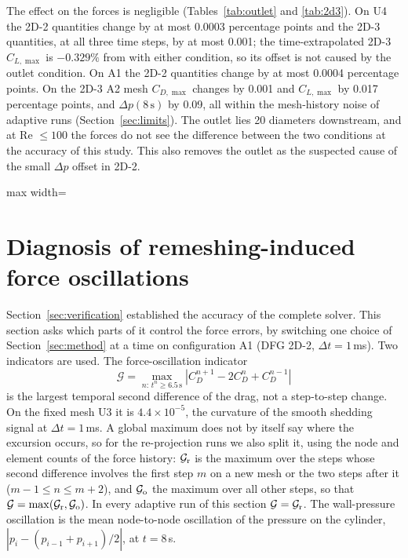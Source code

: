 \documentclass[preprint,12pt,number]{elsarticle}
\newcommand{\fittable}[1]{{\small\setlength{\tabcolsep}{4pt}\begin{adjustbox}{max width=\textwidth}\end{adjustbox}}}
\newcommand{\dt}{\Delta t}
\begin{document}
The effect on the forces is negligible (Tables~\ref{tab:outlet} and \ref{tab:2d3}). On U4 the
2D-2 quantities change by at most 0.0003 percentage points and the 2D-3 quantities, at all
three time steps, by at most 0.001; the time-extrapolated 2D-3 $C_{L,\max}$ is $-0.329\%$ from
\citet{john2004} with either condition, so its offset is not caused by the outlet condition.
On A1 the 2D-2 quantities change by at most 0.0004 percentage points. On the 2D-3 A2 mesh
$C_{D,\max}$ changes by 0.001 and $C_{L,\max}$ by 0.017 percentage points, and $\Delta p(8\,\mathrm{s})$
by 0.09, all within the mesh-history noise of adaptive runs (Section~\ref{sec:limits}). The
outlet lies 20 diameters downstream, and at Re $\le 100$ the forces do not see the difference
between the two conditions at the accuracy of this study. This also removes the outlet as the
suspected cause of the small $\Delta p$ offset in 2D-2.

\begin{table}[!htbp]
\centering
\caption{DFG 2D-2, $\dt = 1\,$ms: errors [\%] against FEATFLOW level 6 with our default outlet
condition ($p$) and with the parabola prescribed at the outlet.}
\label{tab:outlet}
\fittable{tables/tab_outlet.tex}
\end{table}

\section{Diagnosis of remeshing-induced force oscillations}
\label{sec:ablation}

Section~\ref{sec:verification} established the accuracy of the complete solver. This section
asks which parts of it control the force errors, by switching one choice of
Section~\ref{sec:method} at a time on configuration A1 (DFG 2D-2, $\dt = 1\,$ms). Two
indicators are used. The force-oscillation indicator
\[
\mathcal{G} = \max_{n:\,t^n \ge 6.5\,\mathrm{s}} \left|C_D^{n+1} - 2C_D^n + C_D^{n-1}\right|
\]
is the largest temporal second difference of the drag, not a step-to-step change. On the fixed
mesh U3 it is $4.4\times10^{-5}$, the curvature of the smooth shedding signal at
$\dt = 1\,$ms. A global maximum does not by itself say where the excursion occurs, so for the
re-projection runs we also split it, using the node and element counts of the force history:
$\mathcal{G}_{\rm r}$ is the maximum over the steps whose second difference involves the first
step $m$ on a new mesh or the two steps after it ($m - 1 \le n \le m + 2$), and
$\mathcal{G}_{\rm o}$ the maximum over all other steps, so that
$\mathcal{G} = \max(\mathcal{G}_{\rm r}, \mathcal{G}_{\rm o})$. In every adaptive run of this section
$\mathcal{G} = \mathcal{G}_{\rm r}$. The
wall-pressure oscillation is the mean node-to-node oscillation of the pressure on the cylinder,
$|p_i - (p_{i-1} + p_{i+1})/2|$, at $t = 8\,$s.
\end{document}
